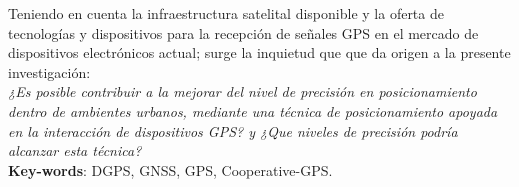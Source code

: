 
Teniendo en cuenta la infraestructura satelital disponible y la oferta de tecnologías y dispositivos para la recepción de señales GPS en el mercado de dispositivos electrónicos actual; surge la inquietud que que da origen a la presente investigación: \\

\textit{¿Es posible contribuir a la mejorar del nivel de precisión en posicionamiento dentro de ambientes urbanos, mediante una técnica de posicionamiento apoyada en la interacción de dispositivos GPS? y ¿Que niveles de precisión podría alcanzar esta técnica?}\\



\textbf{Key-words}:
DGPS, GNSS, GPS, Cooperative-GPS. 
\\




